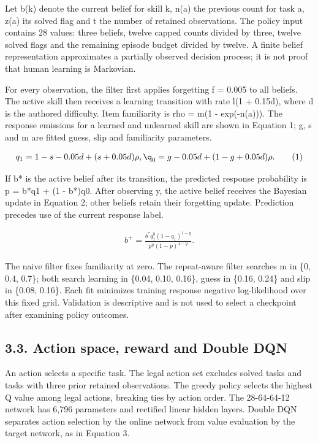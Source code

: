 \documentclass[preprint,11pt,authoryear]{elsarticle}
\begin{document}
Let b(k) denote the current belief for skill k, n(a) the previous count for task a, z(a) its solved flag and t the number of retained observations. The policy input contains 28 values: three beliefs, twelve capped counts divided by three, twelve solved flags and the remaining episode budget divided by twelve. A finite belief representation approximates a partially observed decision process; it is not proof that human learning is Markovian.

For every observation, the filter first applies forgetting f = 0.005 to all beliefs. The active skill then receives a learning transition with rate l(1 + 0.15d), where d is the authored difficulty. Item familiarity is rho = m(1 - exp(-n(a))). The response emissions for a learned and unlearned skill are shown in Equation 1; g, s and m are fitted guess, slip and familiarity parameters.

\begin{equation}\begin{gathered}q_1=1-s-0.05d+(s+0.05d)\rho,\q_0=g-0.05d+(1-g+0.05d)\rho.\end{gathered}\tag{1}\end{equation}

If b* is the active belief after its transition, the predicted response probability is p = b*q1 + (1 - b*)q0. After observing y, the active belief receives the Bayesian update in Equation 2; other beliefs retain their forgetting update. Prediction precedes use of the current response label.

\begin{equation}\begin{gathered}b^{+}=\frac{b^{*}q_1^{y}(1-q_1)^{1-y}}{p^{y}(1-p)^{1-y}}.\end{gathered}\tag{2}\end{equation}

The naive filter fixes familiarity at zero. The repeat-aware filter searches m in \{0, 0.4, 0.7\}; both search learning in \{0.04, 0.10, 0.16\}, guess in \{0.16, 0.24\} and slip in \{0.08, 0.16\}. Each fit minimizes training response negative log-likelihood over this fixed grid. Validation is descriptive and is not used to select a checkpoint after examining policy outcomes.

\subsection*{3.3. Action space, reward and Double DQN}

An action selects a specific task. The legal action set excludes solved tasks and tasks with three prior retained observations. The greedy policy selects the highest Q value among legal actions, breaking ties by action order. The 28-64-64-12 network has 6,796 parameters and rectified linear hidden layers. Double DQN separates action selection by the online network from value evaluation by the target network, as in Equation 3.
\end{document}
